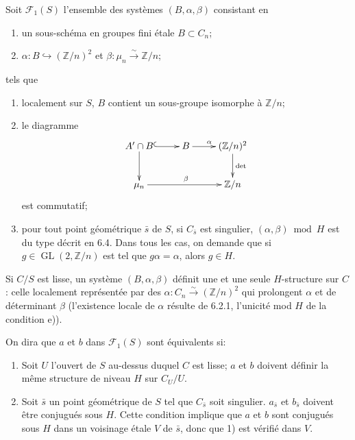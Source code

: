 \documentclass[11pt,a4paper]{amsart}
\theoremstyle{plain}
\theoremstyle{definition}
\DeclareMathOperator{\Gl}{GL}
\newcommand{\CF}{\mathcal{F}}
\newcommand{\ZZ}{\mathbb{Z}}
\begin{document}
\subsubsection{}
Soit $\CF_1(S)$ l'ensemble des syst\`emes $(B, \alpha, \beta)$ consistant en
\begin{enumerate}[label=\alph*)]
\item un sous-sch\'ema en groupes fini \'etale $B \subset C_n$;
\item $\alpha \colon B \hookrightarrow (\ZZ/n)^2$ et $\beta \colon \mu_n \xrightarrow{\sim} \ZZ/n$;
\end{enumerate}
tels que
\begin{enumerate}[label=\alph*), resume]
\item localement sur $S$, $B$ contient un sous-groupe isomorphe \`a $\ZZ/n$;
\item le diagramme
\[
\xymatrix{
A' \cap B \ar@{^(->}[r] \ar[d] & B \ar[r]^{\alpha} & (\ZZ/n)^2 \ar[d]^{\det} \\
\mu_n \ar[rr]^{\beta} & & \ZZ/n
}
\]
est commutatif;
\item pour tout point g\'eom\'etrique $\bar{s}$ de $S$, si $C_{\bar{s}}$ est singulier, $(\alpha, \beta) \bmod H$ est du type d\'ecrit en 6.4. Dans tous les cas, on demande que si $g \in \Gl(2, \ZZ/n)$ est tel que $g\alpha = \alpha$, alors $g \in H$.
\end{enumerate}

Si $C/S$ est lisse, un syst\`eme $(B, \alpha, \beta)$ d\'efinit une et une seule $H$-structure sur $C$: celle localement repr\'esent\'ee par des $\alpha \colon C_n \xrightarrow{\sim} (\ZZ/n)^2$ qui prolongent $\alpha$ et de d\'eterminant $\beta$ (l'existence locale de $\alpha$ r\'esulte de 6.2.1, l'unicit\'e mod $H$ de la condition e)).

On dira que $a$ et $b$ dans $\CF_1(S)$ sont \'equivalents si:
\begin{enumerate}[label=\arabic*)]
\item Soit $U$ l'ouvert de $S$ au-dessus duquel $C$ est lisse; $a$ et $b$ doivent d\'efinir la m\^eme structure de niveau $H$ sur $C_U/U$.
\item Soit $\bar{s}$ un point g\'eom\'etrique de $S$ tel que $C_{\bar{s}}$ soit singulier. $a_{\bar{s}}$ et $b_{\bar{s}}$ doivent \^etre conjugu\'es sous $H$. Cette condition implique que $a$ et $b$ sont conjugu\'es sous $H$ dans un voisinage \'etale $V$ de $\bar{s}$, donc que 1) est v\'erifi\'e dans $V$.
\end{enumerate}
\end{document}
